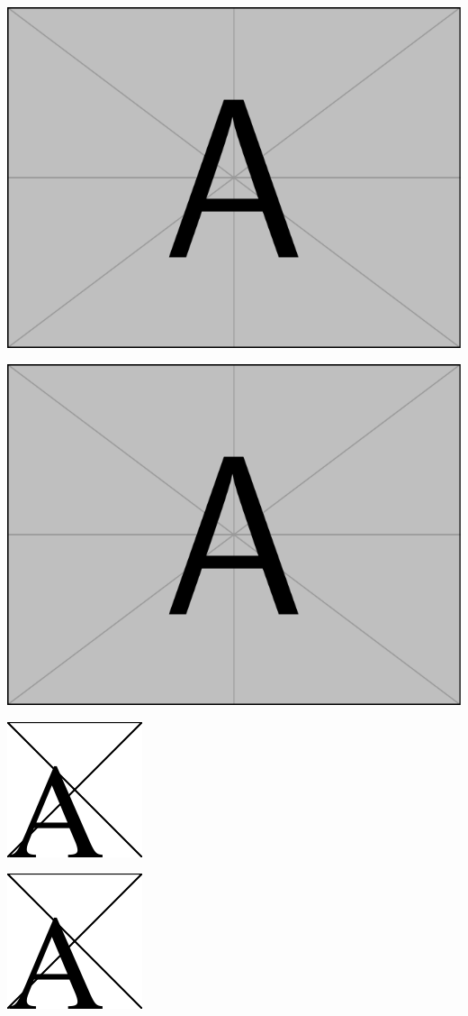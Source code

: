 \documentclass{article}
\begin{document}
\START

\includegraphics{example-image-a}

\includegraphics[page = 1]{example-image-a.pdf}

\includegraphics{az2}

\includegraphics[pagebox = artbox]{az2}
\end{document}
